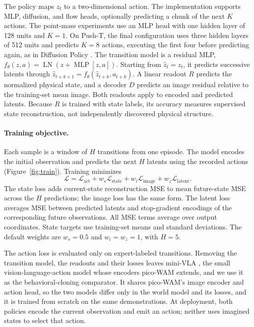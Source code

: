 \documentclass[11pt]{article}
\begin{document}
The policy maps $z_t$ to a two-dimensional action. The implementation supports MLP, diffusion, and flow heads, optionally predicting a chunk of the next $K$ actions. The point-mass experiments use an MLP head with one hidden layer of 128 units and $K=1$. On Push-T, the final configuration uses three hidden layers of 512 units and predicts $K=8$ actions, executing the first four before predicting again, as in Diffusion Policy \citep{chi2023diffusion}. The transition model is a residual MLP, $f_\theta(z,a)=\operatorname{LN}(z+\operatorname{MLP}[z,a])$. Starting from $\hat z_t=z_t$, it predicts successive latents through $\hat z_{t+k+1}=f_\theta(\hat z_{t+k},a_{t+k})$. A linear readout $R$ predicts the normalized physical state, and a decoder $D$ predicts an image residual relative to the training-set mean image. Both readouts apply to encoded and predicted latents. Because $R$ is trained with state labels, its accuracy measures supervised state reconstruction, not independently discovered physical structure.

\paragraph{Training objective.} Each sample is a window of $H$ transitions from one episode. The model encodes the initial observation and predicts the next $H$ latents using the recorded actions (Figure~\ref{fig:train}). Training minimizes
\begin{equation}
\mathcal L=\mathcal L_{\mathrm{act}}+w_s\mathcal L_{\mathrm{state}}
+w_i\mathcal L_{\mathrm{image}}+w_z\mathcal L_{\mathrm{latent}}.
\label{eq:loss}
\end{equation}
The state loss adds current-state reconstruction MSE to mean future-state MSE across the $H$ predictions; the image loss has the same form. The latent loss averages MSE between predicted latents and stop-gradient encodings of the corresponding future observations. All MSE terms average over output coordinates. State targets use training-set means and standard deviations. The default weights are $w_s=0.5$ and $w_i=w_z=1$, with $H=5$.

The action loss is evaluated only on expert-labeled transitions. Removing the transition model, the readouts and their losses leaves mini-VLA \citep{pandya2025minivla}, the small vision-language-action model whose encoders pico-WAM extends, and we use it as the behavioral-cloning comparator. It shares pico-WAM's image encoder and action head, so the two models differ only in the world model and its losses, and it is trained from scratch on the same demonstrations. At deployment, both policies encode the current observation and emit an action; neither uses imagined states to select that action.
\end{document}

